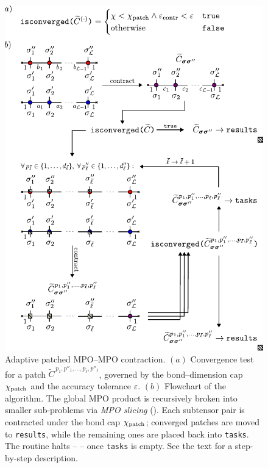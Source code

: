 \begin{figure}[ht!]
    \centering
    \includegraphics{figures/AdaptivePatchContr.pdf}
    \caption{Adaptive patched MPO–MPO contraction. $(a)$ Convergence test for a patch
    \(\widetilde{C}^{\,p_1,p''_1,\dots,p_{\bar\ell},p''_{\bar\ell}}\), governed by the bond–dimension cap \(\chi_{\text{patch}}\) and the accuracy tolerance \(\varepsilon\). $(b)$ Flowchart of the algorithm.
    The global MPO product is recursively broken into smaller sub-problems via \emph{MPO slicing}
    ().
    Each subtensor pair is contracted under the bond cap $\chi_{\text{patch}}$; converged patches are moved to \texttt{results}, while the remaining ones are
    placed back into \texttt{tasks}.
    The routine halts --  -- once \texttt{tasks} is empty. See the text for a step-by-step description.}
    \label{fig:adaptiveMatMul}
\end{figure}


